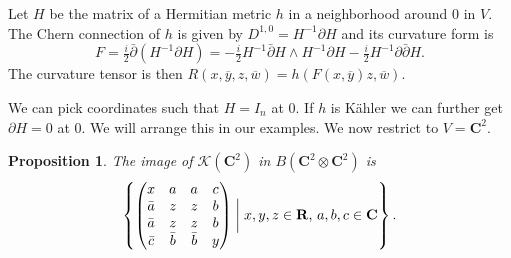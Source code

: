 \documentclass[10pt,a4paper]{amsart}
\newtheorem{prop}[theo]{Proposition}
\theoremstyle{definition}
\def\ov#1{\overline{#1}}
\newcommand{\kk}[1]{\mathbf{#1}}
\newcommand{\cc}[1]{\mathcal{#1}}
\begin{document}
Let $H$ be the matrix of a Hermitian metric $h$ in a neighborhood around $0$ in
$V$. The Chern connection of $h$ is given by $D^{1,0} = H^{-1}\partial H$ and its
curvature form is
$$
F = \tfrac i2 \bar\partial(H^{-1}\partial H)
= - \tfrac i2 H^{-1} \bar\partial H \wedge H^{-1} \partial H
- \tfrac i2 H^{-1} \partial \bar\partial H.
$$
The curvature tensor is then $R(x,\ov y, z, \ov w) = h(F(x, \ov y) z, \ov w)$.

We can pick coordinates such that $H = I_n$ at $0$.
If $h$ is K\"ahler we can further get $\partial H = 0$ at $0$.
We will arrange this in our examples.
We now restrict to $V = \kk C^2$.

\begin{prop}
The image of $\cc K(\kk C^2)$ in $B(\kk C^2 \otimes \kk C^2)$ is
$$
\left\{
\begin{pmatrix}
x & a & a & c
\\
\bar a & z & z & b
\\
\bar a & z & z & b
\\
\bar c & \bar b & \bar b & y
\end{pmatrix}
\biggm|
\text{$x, y, z \in \kk R$, $a, b, c \in \kk C$}
\right\}.
$$
\end{prop}
\end{document}

